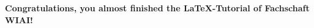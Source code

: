 



\newpage
\setcounter{page}{2}
\tableofcontents
\newpage
\listoffigures
\newpage
\listoftables
\newpage
\setcounter{page}{1}

\newpage

\newpage


\noindent \textbf{Congratulations, you almost finished the \LaTeX -Tutorial of Fachschaft WIAI!}

